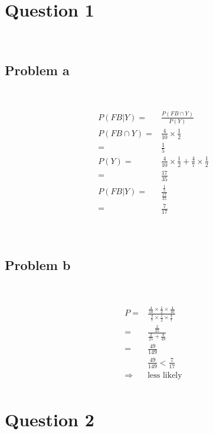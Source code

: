 \documentclass{article}
\begin{document}
\section*{Question 1}

~

\subsection*{Problem a}

~

\begin{equation*}
    \begin{split}
        P(FB|Y)=&\frac{P(FB\cap Y)}{P(Y)}\\
        P(FB\cap Y)=&\frac{4}{10}\times\frac{1}{2}\\
        =&\frac{1}{5}\\
        P(Y)=&\frac{4}{10}\times\frac{1}{2}+\frac{4}{7}\times\frac{1}{2}\\
        =&\frac{17}{35}\\
        P(FB|Y)=&\frac{\frac{1}{5}}{\frac{17}{35}}\\
        =&\frac{7}{17}\\
    \end{split}
\end{equation*}

~

\subsection*{Problem b}

~

\begin{equation*}
    \begin{split}
        P=&\frac{\frac{4}{10}\times\frac{1}{2}\times\frac{4}{10}}{\frac{4}{7}\times\frac{1}{2}\times\frac{4}{7}}\\
        =&\frac{\frac{2}{25}}{\frac{2}{25}+\frac{8}{49}}\\
        =&\frac{49}{149}\\
        &\frac{49}{149}<\frac{7}{17}\\
        \Rightarrow&\text{less likely}\\
    \end{split}
\end{equation*}

\newpage

\section*{Question 2}
\end{document}
